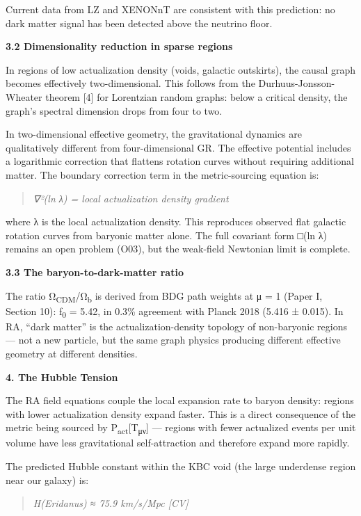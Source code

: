 \documentclass[12pt,a4paper]{article}
\begin{document}
Current data from LZ and XENONnT are consistent with this prediction: no
dark matter signal has been detected above the neutrino floor.

\textbf{3.2 Dimensionality reduction in sparse regions}

In regions of low actualization density (voids, galactic outskirts), the
causal graph becomes effectively two-dimensional. This follows from the
Durhuus-Jonsson-Wheater theorem {[}4{]} for Lorentzian random graphs:
below a critical density, the graph's spectral dimension drops from four
to two.

In two-dimensional effective geometry, the gravitational dynamics are
qualitatively different from four-dimensional GR. The effective
potential includes a logarithmic correction that flattens rotation
curves without requiring additional matter. The boundary correction term
in the metric-sourcing equation is:

\begin{quote}
\emph{∇²(ln λ) = local actualization density gradient}
\end{quote}

where λ is the local actualization density. This reproduces observed
flat galactic rotation curves from baryonic matter alone. The full
covariant form □(ln λ) remains an open problem (O03), but the weak-field
Newtonian limit is complete.

\textbf{3.3 The baryon-to-dark-matter ratio}

The ratio Ω\textsubscript{CDM}/Ω\textsubscript{b} is derived from BDG
path weights at μ = 1 (Paper I, Section 10): f\textsubscript{0} = 5.42,
in 0.3\% agreement with Planck 2018 (5.416 ± 0.015). In RA, ``dark
matter'' is the actualization-density topology of non-baryonic regions
--- not a new particle, but the same graph physics producing different
effective geometry at different densities.

\textbf{4. The Hubble Tension}

The RA field equations couple the local expansion rate to baryon
density: regions with lower actualization density expand faster. This is
a direct consequence of the metric being sourced by
P\textsubscript{act}{[}T\textsubscript{μν}{]} --- regions with fewer
actualized events per unit volume have less gravitational
self-attraction and therefore expand more rapidly.

The predicted Hubble constant within the KBC void (the large underdense
region near our galaxy) is:

\begin{quote}
\emph{H(Eridanus) ≈ 75.9 km/s/Mpc {[}CV{]}}
\end{quote}
\end{document}
